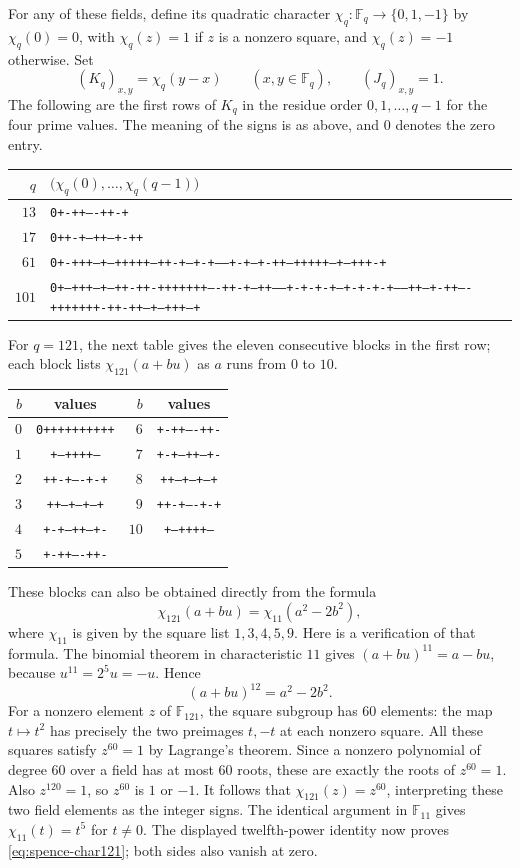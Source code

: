 \documentclass[10pt]{article}
\begin{document}
For any of these fields, define its quadratic character
$\chi_q\colon\mathbb F_q\to\{0,1,-1\}$ by $\chi_q(0)=0$, with
$\chi_q(z)=1$ if $z$ is a nonzero square, and $\chi_q(z)=-1$ otherwise.
Set
\[
 (K_q)_{x,y}=\chi_q(y-x)\qquad(x,y\in\mathbb F_q),
 \qquad (J_q)_{x,y}=1.
\]
The following are the first rows of $K_q$ in the residue order
$0,1,\ldots,q-1$ for the four prime values. The meaning of the signs is
as above, and $0$ denotes the zero entry.
\begin{center}\scriptsize
\begin{tabular}{rl}
$q$&$\bigl(\chi_q(0),\ldots,\chi_q(q-1)\bigr)$\\\hline
$13$&\texttt{0+-++----++-+}\\
$17$&\texttt{0++-+---++---+-++}\\
$61$&\texttt{0+-+++---+--+++++--++-+--+-+------+-+--+-++--+++++--+---+++-+}\\
$101$&\texttt{0+--+++--+---++-++-+++++++----++-+--++-----+-+-+-+--+-+-+-+-----++--+-++----+++++++-++-++---+--+++--+}\\
\end{tabular}
\end{center}
For $q=121$, the next table gives the eleven consecutive blocks in the
first row; each block lists $\chi_{121}(a+bu)$ as $a$ runs from $0$ to $10$.
\begin{center}\small
\begin{tabular}{rc@{\qquad}rc}
$b$&values&$b$&values\\\hline
$0$&\texttt{0++++++++++}&$6$&\texttt{+-++----++-}\\
$1$&\texttt{+---++++---}&$7$&\texttt{+-+--++--+-}\\
$2$&\texttt{++-+----+-+}&$8$&\texttt{++--+--+--+}\\
$3$&\texttt{++--+--+--+}&$9$&\texttt{++-+----+-+}\\
$4$&\texttt{+-+--++--+-}&$10$&\texttt{+---++++---}\\
$5$&\texttt{+-++----++-}&&\\
\end{tabular}
\end{center}
These blocks can also be obtained directly from the formula
\begin{equation}\label{eq:spence-char121}
 \chi_{121}(a+bu)=\chi_{11}(a^2-2b^2),
\end{equation}
where $\chi_{11}$ is given by the square list $1,3,4,5,9$.
Here is a verification of that formula. The binomial theorem in
characteristic $11$ gives $(a+bu)^{11}=a-bu$, because
$u^{11}=2^5u=-u$. Hence
\[
 (a+bu)^{12}=a^2-2b^2.
\]
For a nonzero element $z$ of $\mathbb F_{121}$, the square subgroup has
$60$ elements: the map $t\mapsto t^2$ has precisely the two preimages
$t,-t$ at each nonzero square. All these squares satisfy $z^{60}=1$ by
Lagrange's theorem. Since a nonzero polynomial of degree $60$ over a field
has at most $60$ roots, these are exactly the roots of $z^{60}=1$.
Also $z^{120}=1$, so $z^{60}$ is $1$ or $-1$. It follows that
$\chi_{121}(z)=z^{60}$, interpreting these two field elements as the
integer signs. The identical argument in $\mathbb F_{11}$ gives
$\chi_{11}(t)=t^5$ for $t\ne0$. The displayed twelfth-power identity now
proves \eqref{eq:spence-char121}; both sides also vanish at zero.
\end{document}
